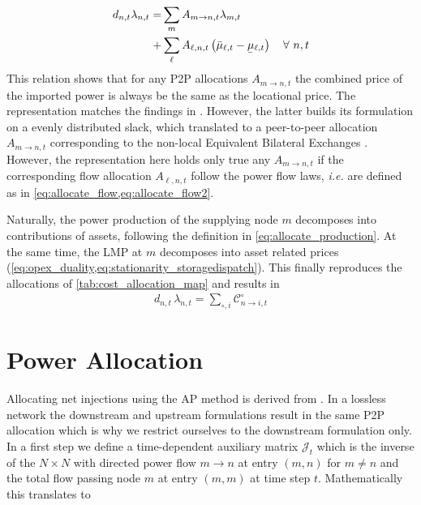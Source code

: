 \documentclass[11pt,twocolumn]{article}
\newcommand{\ie}{\textit{i.e.} }
\newcommand{\ubar}[1]{\underaccent{\bar}{#1}}
\newcommand{\Forall}[1]{\hspace{10pt} \forall \,\, #1 }
\newcommand{\mulowerflow}{\ubar{\mu}_{\ell,t}}
\newcommand{\muupperflow}{\bar{\mu}_{\ell,t}}
\newcommand{\lmp}[1][n]{\lambda_{#1,t}}
\newcommand{\demand}[1][n]{d_{#1,t}}
\newcommand{\cost}[1][\circ]{\mathcal{C}^{#1}}
\newcommand{\allocatepeer}[1][m \rightarrow n]{A_{#1,t}}
\newcommand{\allocateflow}[1][n]{A_{\ell,#1,t}}
\newcommand{\allocatecost}[1][n \rightarrow i]{\cost_{#1, t}}
\begin{document}
\begin{align}
    \notag
    \demand \lmp =& \sum_{m} \allocatepeer \lmp[m] \\
    +& \sum_\ell \allocateflow \left(\muupperflow - \mulowerflow\right) \Forall{n,t}
\end{align}
This relation shows that for any P2P allocations $\allocatepeer$ the combined price of the imported power is always be the same as the locational price. The representation matches the findings in \cite{wu_locational_2005}. However, the latter builds its formulation on a evenly distributed slack, which translated to a peer-to-peer allocation $\allocatepeer$ corresponding to the non-local Equivalent Bilateral Exchanges \cite{galiana_transmission_2003}. However, the representation here holds only true any $\allocatepeer$ if the corresponding flow allocation $\allocateflow$ follow the power flow laws, \ie are defined as in \cref{eq:allocate_flow,eq:allocate_flow2}. 

Naturally, the power production of the supplying node $m$ decomposes into contributions of assets, following the definition in \cref{eq:allocate_production}. At the same time, the LMP at $m$ decomposes into asset related prices (\cref{eq:opex_duality,eq:stationarity_storagedispatch}). This finally reproduces the allocations of \cref{tab:cost_allocation_map} and results in 
\begin{align}
    \demand \, \lmp =  \sum_{\circ, i} \allocatecost 
\end{align}


\section{Power Allocation}
\label{sec:net_ap}

\newcommand{\incidenceM}{K}
\newcommand{\flowM}{f}
\newcommand{\injectionM}{p}
\newcommand{\slackM}{k}
\newcommand{\DirectedIncidence}{\mathcal{K}}
\newcommand{\InverseAPInjection}{\mathcal{J}}
\newcommand\diag[1]{\operatorname{diag}\left(#1\right)}


Allocating net injections using the AP method is derived from \cite{achayuthakan_electricity_2010}. In a lossless network the downstream and upstream formulations result in the same P2P allocation which is why we restrict ourselves to the downstream formulation only. In a first step we define a time-dependent auxiliary matrix $\InverseAPInjection_t$ which is the inverse of the $N\times N$ with directed power flow $m \rightarrow n$ at entry $(m, n)$ for $m \ne n$ and the total flow passing node $m$ at entry $\left( m, m\right)$ at time step $t$. Mathematically this translates to
\end{document}

